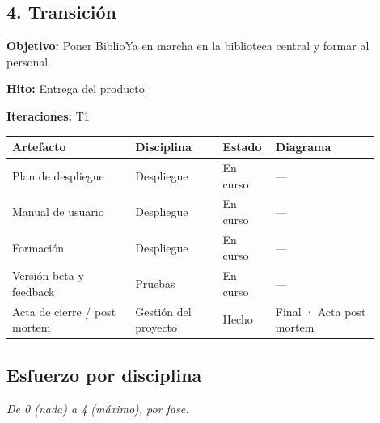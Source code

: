\documentclass[11pt,a4paper]{article}
\begin{document}
\subsection*{4. Transición}

\textbf{Objetivo:} Poner BiblioYa en marcha en la biblioteca central y formar al personal.

\textbf{Hito:} Entrega del producto

\textbf{Iteraciones:} T1

{\small
\begin{longtable}{@{}>{\raggedright\arraybackslash}p{0.311\linewidth}>{\raggedright\arraybackslash}p{0.224\linewidth}>{\raggedright\arraybackslash}p{0.096\linewidth}>{\raggedright\arraybackslash}p{0.267\linewidth}@{}}
\toprule
\textbf{Artefacto} & \textbf{Disciplina} & \textbf{Estado} & \textbf{Diagrama} \\
\midrule
\endhead
Plan de despliegue & Despliegue & En curso & — \\
Manual de usuario & Despliegue & En curso & — \\
Formación & Despliegue & En curso & — \\
Versión beta y feedback & Pruebas & En curso & — \\
Acta de cierre / post mortem & Gestión del proyecto & Hecho & Final · Acta post mortem \\
\bottomrule
\end{longtable}}

\subsection*{Esfuerzo por disciplina}

\emph{De 0 (nada) a 4 (máximo), por fase.}
\end{document}
